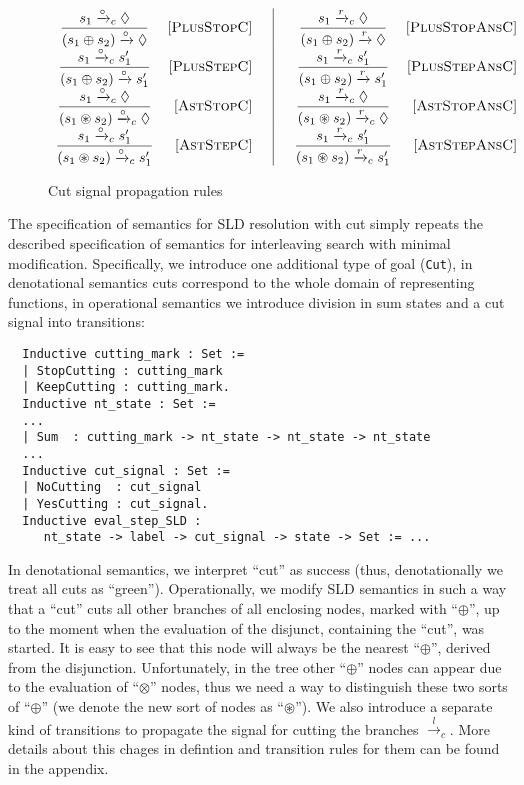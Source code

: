 \begin{figure*}[t]
\[
\begin{array}{crc|ccr}
  \dfrac{s_1 \xrightarrow{\circ}_c \Diamond}{(s_1 \oplus s_2) \xrightarrow{\circ} \Diamond} & \mbox{[\textsc{PlusStopC}]}& & &
  \dfrac{s_1 \xrightarrow{r}_c \Diamond}{(s_1 \oplus s_2) \xrightarrow{r} \Diamond} & \mbox{[\textsc{PlusStopAnsC}]}\\
  \dfrac{s_1 \xrightarrow{\circ}_c s'_1}{(s_1 \oplus s_2) \xrightarrow{\circ} s'_1} &\mbox{[\textsc{PlusStepC}]}& & &
  \dfrac{s_1 \xrightarrow{r}_c s'_1}{(s_1 \oplus s_2) \xrightarrow{r} s'_1} &\mbox{[\textsc{PlusStepAnsC}]}\\
  \dfrac{s_1 \xrightarrow{\circ}_c \Diamond}{(s_1 \circledast s_2) \xrightarrow{\circ}_c \Diamond} & \mbox{[\textsc{AstStopC}]}& & &
  \dfrac{s_1 \xrightarrow{r}_c \Diamond}{(s_1 \circledast s_2) \xrightarrow{r}_c \Diamond} & \mbox{[\textsc{AstStopAnsC}]}\\
  \dfrac{s_1 \xrightarrow{\circ}_c s'_1}{(s_1 \circledast s_2) \xrightarrow{\circ}_c s'_1} &\mbox{[\textsc{AstStepC}]}& & &
  \dfrac{s_1 \xrightarrow{r}_c s'_1}{(s_1 \circledast s_2) \xrightarrow{r}_c s'_1} &\mbox{[\textsc{AstStepAnsC}]}
\end{array}
\]
\caption{Cut signal propagation rules}
\label{cut-signal-propagation}
\end{figure*}

The specification of semantics for SLD resolution with cut simply repeats the described specification of semantics for interleaving search with minimal modification. Specifically, we introduce one additional type of goal (\lstinline|Cut|), in denotational semantics cuts correspond to the whole domain of representing functions, in operational semantics we introduce division in sum states and a cut signal into transitions:

\begin{lstlisting}
  Inductive cutting_mark : Set :=
  | StopCutting : cutting_mark
  | KeepCutting : cutting_mark.
  Inductive nt_state : Set :=
  ...
  | Sum  : cutting_mark -> nt_state -> nt_state -> nt_state
  ...
  Inductive cut_signal : Set :=
  | NoCutting  : cut_signal
  | YesCutting : cut_signal.
  Inductive eval_step_SLD :
     nt_state -> label -> cut_signal -> state -> Set := ...
\end{lstlisting}

In denotational semantics, we interpret ``cut'' as success (thus, denotationally we treat all cuts as ``green''). Operationally, we
modify SLD semantics in such a way that a ``cut'' cuts all other branches of all enclosing nodes, marked with ``$\oplus$'', up to
the moment when the evaluation of the disjunct, containing the ``cut'', was started. It is easy to see that this node will always
be the nearest ``$\oplus$'', derived from the disjunction. Unfortunately, in the tree other ``$\oplus$'' nodes can
appear due to the evaluation of ``$\otimes$'' nodes, thus we need a way to distinguish these two sorts of ``$\oplus$'' (we
denote the new sort of nodes as ``$\circledast$''). We also introduce a separate kind of transitions to propagate the signal for cutting the branches $\xrightarrow{l}_c$.
More details about this chages in defintion and transition rules for them can be found in the appendix.

